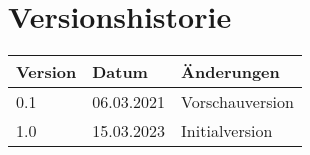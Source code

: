 \section{Versionshistorie}

\begin{table}[ht]
  \centering
  \begin{tabular}{|l|l|l|}
    \hline
    \textbf{Version} & \textbf{Datum} & \textbf{Änderungen} \\ \hline
    0.1              & 06.03.2021     & Vorschauversion     \\ \hline
    1.0              & 15.03.2023     & Initialversion      \\ \hline
  \end{tabular}
\end{table}